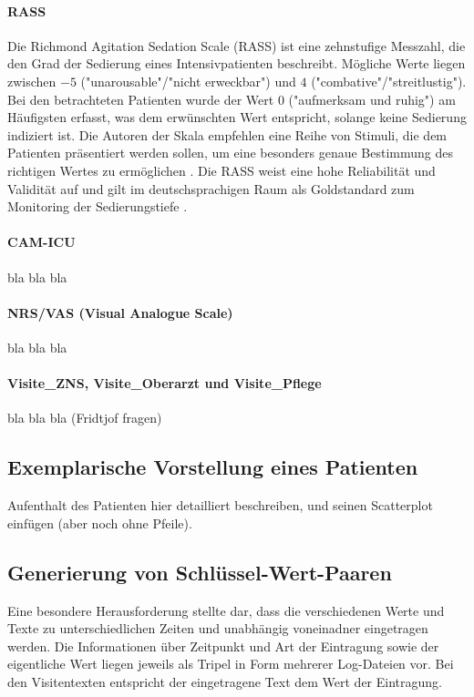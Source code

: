 \paragraph{RASS}
Die Richmond Agitation Sedation Scale (RASS) ist eine zehnstufige Messzahl, die den Grad der Sedierung eines Intensivpatienten beschreibt. Mögliche Werte liegen zwischen $-5$ ("unarousable"/"nicht erweckbar") und $4$ ("combative"/"streitlustig"). Bei den betrachteten Patienten wurde der Wert $0$ ("aufmerksam und ruhig") am Häufigsten erfasst, was dem erwünschten Wert entspricht, solange keine Sedierung indiziert ist. Die Autoren der Skala empfehlen eine Reihe von Stimuli, die dem Patienten präsentiert werden sollen, um eine besonders genaue Bestimmung des richtigen Wertes zu ermöglichen \citep{sesslerRichmondAgitationSedation2002a}. Die RASS weist eine hohe Reliabilität und Validität auf und gilt im deutschsprachigen Raum als Goldstandard zum Monitoring der Sedierungstiefe \citep{marxIntensivmedizin2015c, muellerAnalgesieSedierungUnd2015}.

\paragraph{CAM-ICU}
bla bla bla %

\paragraph{NRS/VAS (Visual Analogue Scale)}
bla bla bla

\paragraph{Visite\_ZNS, Visite\_Oberarzt und Visite\_Pflege}
bla bla bla (Fridtjof fragen)


\subsection{Exemplarische Vorstellung eines Patienten} %
Aufenthalt des Patienten hier detailliert beschreiben, und seinen Scatterplot einfügen (aber noch ohne Pfeile).

\subsection{Generierung von Schlüssel-Wert-Paaren}
Eine besondere Herausforderung stellte dar, dass die verschiedenen Werte und Texte zu unterschiedlichen Zeiten und unabhängig voneinadner eingetragen werden. Die Informationen über Zeitpunkt und Art der Eintragung sowie der eigentliche Wert liegen jeweils als Tripel in Form mehrerer Log-Dateien vor. Bei den Visitentexten entspricht der eingetragene Text dem Wert der Eintragung.

